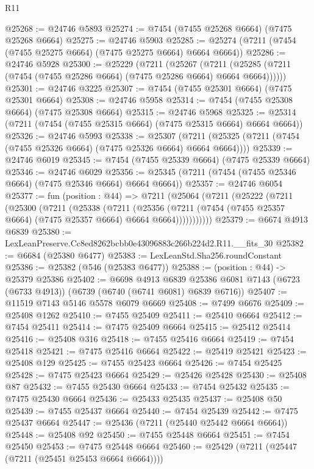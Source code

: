 \begin{lexlean}{R11}
\begin{coremodule}
@25268 := @24746 @5893
@25274 := @7454 (@7455 @25268 @6664) (@7475 @25268 @6664)
@25275 := @24746 @5903
@25285 := @25274 (@7211 (@7454 (@7455 @25275 @6664) (@7475 @25275 @6664) @6664 @6664))
@25286 := @24746 @5928
@25300 := @25229
    (@7211
      (@25267
        (@7211 (@25285 (@7211 (@7454 (@7455 @25286 @6664) (@7475 @25286 @6664) @6664 @6664))))))
@25301 := @24746 @3225
@25307 := @7454 (@7455 @25301 @6664) (@7475 @25301 @6664)
@25308 := @24746 @5958
@25314 := @7454 (@7455 @25308 @6664) (@7475 @25308 @6664)
@25315 := @24746 @5968
@25325 := @25314 (@7211 (@7454 (@7455 @25315 @6664) (@7475 @25315 @6664) @6664 @6664))
@25326 := @24746 @5993
@25338 := @25307
    (@7211 (@25325 (@7211 (@7454 (@7455 @25326 @6664) (@7475 @25326 @6664) @6664 @6664))))
@25339 := @24746 @6019
@25345 := @7454 (@7455 @25339 @6664) (@7475 @25339 @6664)
@25346 := @24746 @6029
@25356 := @25345 (@7211 (@7454 (@7455 @25346 @6664) (@7475 @25346 @6664) @6664 @6664))
@25357 := @24746 @6054
@25377 := fun (position : @44) =>
  @7211
    (@25064
      (@7211
        (@25222
          (@7211
            (@25300
              (@7211
                (@25338
                  (@7211
                    (@25356
                      (@7211 (@7454 (@7455 @25357 @6664) (@7475 @25357 @6664) @6664 @6664)))))))))))
@25379 := @6674 @4913 @6839
@25380 := LexLeanPreserve.Cc8ed8262bcbb0e43096883c266b224d2.R11.__fits_30
@25382 := @6684 (@25380 @6477)
@25383 := LexLeanStd.Sha256.roundConstant
@25386 := @25382 (@546 (@25383 @6477))
@25388 := (position : @44) -> @25379 @25386
@25402 := @6698
    @4913
    @6839
    @25386
    @6081
    @7143
    (@6723 (@6733 @4913))
    (@6739 (@6740 (@6741 @6081) @6839 @6716))
@25407 := @11519 @7143 @5146 @5578 @6079 @6669
@25408 := @7499 @6676
@25409 := @25408 @1262
@25410 := @7455 @25409
@25411 := @25410 @6664
@25412 := @7454 @25411
@25414 := @7475 @25409 @6664
@25415 := @25412 @25414
@25416 := @25408 @316
@25418 := @7455 @25416 @6664
@25419 := @7454 @25418
@25421 := @7475 @25416 @6664
@25422 := @25419 @25421
@25423 := @25408 @129
@25425 := @7455 @25423 @6664
@25426 := @7454 @25425
@25428 := @7475 @25423 @6664
@25429 := @25426 @25428
@25430 := @25408 @87
@25432 := @7455 @25430 @6664
@25433 := @7454 @25432
@25435 := @7475 @25430 @6664
@25436 := @25433 @25435
@25437 := @25408 @50
@25439 := @7455 @25437 @6664
@25440 := @7454 @25439
@25442 := @7475 @25437 @6664
@25447 := @25436 (@7211 (@25440 @25442 @6664 @6664))
@25448 := @25408 @92
@25450 := @7455 @25448 @6664
@25451 := @7454 @25450
@25453 := @7475 @25448 @6664
@25460 := @25429 (@7211 (@25447 (@7211 (@25451 @25453 @6664 @6664))))

\end{coremodule}
\end{lexlean}
